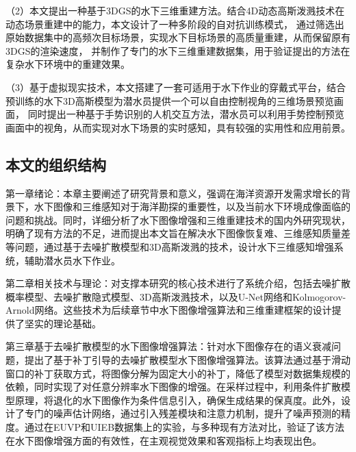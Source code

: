 （2）本文提出一种基于3DGS的水下三维重建方法。结合4D动态高斯泼溅技术在动态场景重建中的能力，本文设计了一种多阶段的自对抗训练模式，
通过筛选出原始数据集中的高频次目标场景，实现水下目标场景的高质量重建，从而保留原有3DGS的渲染速度，
并制作了专门的水下三维重建数据集，用于验证提出的方法在复杂水下环境中的重建效果。

（3）基于虚拟现实技术，本文搭建了一套可适用于水下作业的穿戴式平台，结合预训练的水下3D高斯模型为潜水员提供一个可以自由控制视角的三维场景预览画面，
同时提出一种基于手势识别的人机交互方法，潜水员可以利用手势控制预览画面中的视角，从而实现对水下场景的实时感知，具有较强的实用性和应用前景。\cite{underwater_perception}




\subsection{本文的组织结构}
第一章绪论：本章主要阐述了研究背景和意义，强调在海洋资源开发需求增长的背景下，水下图像和三维感知对于海洋勘探的重要性，以及当前水下环境成像面临的问题和挑战。同时，详细分析了水下图像增强和三维重建技术的国内外研究现状，明确了现有方法的不足，进而提出本文旨在解决水下图像恢复难、三维感知质量差等问题，通过基于去噪扩散模型和3D高斯泼溅的技术，设计水下三维感知增强系统，辅助潜水员水下作业。

第二章相关技术与理论：对支撑本研究的核心技术进行了系统介绍，包括去噪扩散概率模型、去噪扩散隐式模型、3D高斯泼溅技术，以及U-Net网络和Kolmogorov-Arnold网络。这些技术为后续章节中水下图像增强算法和三维重建框架的设计提供了坚实的理论基础。

第三章基于去噪扩散模型的水下图像增强算法：针对水下图像存在的语义衰减问题，提出了基于补丁引导的去噪扩散模型水下图像增强算法。该算法通过基于滑动窗口的补丁获取方式，将图像分解为固定大小的补丁，降低了模型对数据集规模的依赖，同时实现了对任意分辨率水下图像的增强。在采样过程中，利用条件扩散模型原理，将退化的水下图像作为条件信息引入，确保生成结果的保真度。此外，设计了专门的噪声估计网络，通过引入残差模块和注意力机制，提升了噪声预测的精度。通过在EUVP和UIEB数据集上的实验，与多种现有方法对比，验证了该方法在水下图像增强方面的有效性，在主观视觉效果和客观指标上均表现出色。


